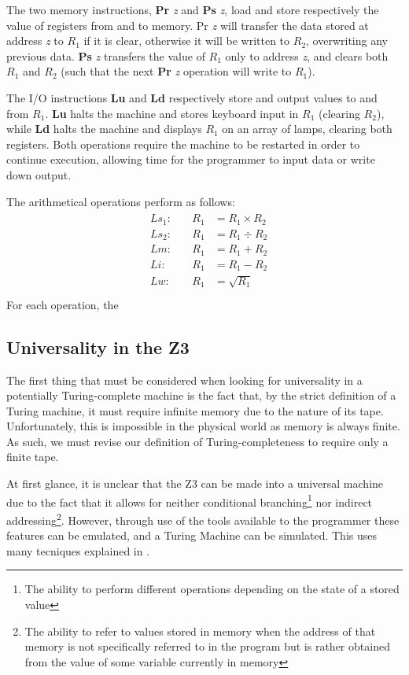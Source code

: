 \documentclass[Master.tex]{subfiles}
\begin{document}
The two memory instructions, \textbf{Pr} \textit{z} and \textbf{Ps} \textit{z}, load and store respectively the value of registers from and to memory. Pr \textit{z} will transfer the data stored at address \textit{z} to $R_1$ if it is clear, otherwise it will be written to $R_2$, overwriting any previous data. \textbf{Ps} \textit{z} transfers the value of $R_1$ only to address \textit{z}, and clears both $R_1$ and $R_2$ (such that the next \textbf{Pr} \textit{z} operation will write to $R_1$). 

The I/O instructions \textbf{Lu} and \textbf{Ld} respectively store and output values to and from $R_1$. \textbf{Lu} halts the machine and stores keyboard input in $R_1$ (clearing $R_2$), while \textbf{Ld} halts the machine and displays $R_1$ on an array of lamps, clearing both registers. Both operations require the machine to be restarted in order to continue execution, allowing time for the programmer to input data or write down output.

The arithmetical operations perform as follows:
\begin{gather*}
\begin{aligned}
&Ls_1:\quad	&R_1 &= R_1 \times R_2 \\
&Ls_2:\quad	&R_1 &= R_1 \div R_2 \\
&Lm:\quad	&R_1 &= R_1 + R_2 \\
&Li:\quad	&R_1 &= R_1 - R_2 \\
&Lw:\quad	&R_1 &= \sqrt{R_1} \\
\end{aligned}
\end{gather*}
For each operation, the 
\subsection{Universality in the Z3}

The first thing that must be considered when looking for universality in a potentially Turing-complete machine is the fact that, by the strict definition of a Turing machine, it must require infinite memory due to the nature of its tape. Unfortunately, this is impossible in the physical world as memory is always finite. As such, we must revise our definition of Turing-completeness to require only a finite tape.

At first glance, it is unclear that the Z3 can be made into a universal machine due to the fact that it allows for neither conditional branching\footnote{The ability to perform different operations depending on the state of a stored value} nor indirect addressing\footnote{The ability to refer to values stored in memory when the address of that memory is not specifically referred to in the program but is rather obtained from the value of some variable currently in memory}. However, through use of the tools available to the programmer these features can be emulated, and a Turing Machine can be simulated. This uses many tecniques explained in \cite{rojas1998z3universal}.
\end{document}

